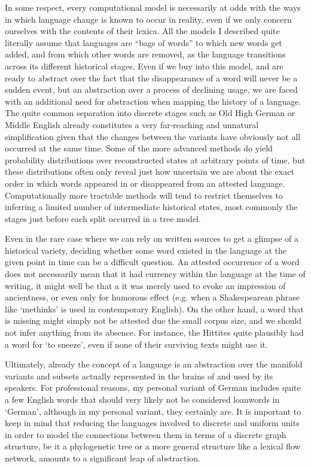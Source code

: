 In some respect, every computational model is necessarily at odds with the ways in which language change is known to occur in reality, even if we only concern ourselves with the contents of their lexica. All the models I described quite literally assume that languages are ``bags of words'' to which new words get added, and from which other words are removed, as the language transitions across its different historical stages. Even if we buy into this model, and are ready to abstract over the fact that the disappearance of a word will never be a sudden event, but an abstraction over a process of declining usage, we are faced with an additional need for abstraction when mapping the history of a language. The quite common separation into discrete stages such as Old High German or Middle English already constitutes a very far-reaching and unnatural simplification given that the changes between the variants have obviously not all occurred at the same time. Some of the more advanced methods do yield probability distributions over reconstructed states at arbitrary points of time, but these distributions often only reveal just how uncertain we are about the exact order in which words appeared in or disappeared from an attested language. Computationally more tractable methods will tend to restrict themselves to inferring a limited number of intermediate historical states, most commonly the stages just before each split occurred in a tree model.

\largerpage
Even in the rare case where we can rely on written sources to get a glimpse of a historical variety, deciding whether some word existed in the language at the given point in time can be a difficult question. An attested occurrence of a word does not necessarily mean that it had currency within the language at the time of writing, it might well be that a it was merely used to evoke an impression of ancientness, or even only for humorous effect (e.g. when a Shakespearean phrase like `methinks' is used in contemporary English). On the other hand, a word that is missing might simply not be attested due the small corpus size, and we should not infer anything from its absence. For instance, the Hittites quite plausibly had a word for `to sneeze', even if none of their surviving texts might use it. 

Ultimately, already the concept of a language is an abstraction over the manifold variants and subsets actually represented in the brains of and used by its speakers. For professional reasons, my personal variant of German includes quite a few English words that should very likely not be considered loanwords in `German', although in my personal variant, they certainly are. It is important to keep in mind that reducing the languages involved to discrete and uniform units in order to model the connections between them in terms of a discrete graph structure, be it a phylogenetic tree or a more general structure like a lexical flow network, amounts to a significant leap of abstraction. 

